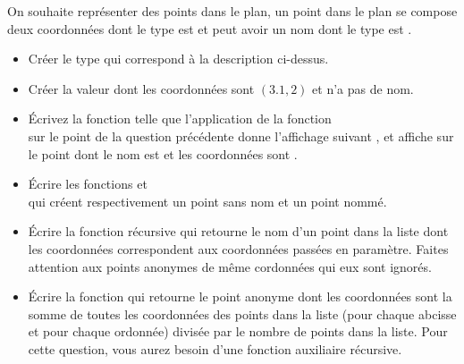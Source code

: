 \begin{qu}
On souhaite représenter des points dans le plan, un point dans le
  plan se compose deux coordonnées dont le type est  et peut
  avoir un nom dont le type est .
  \begin{itemize}
  \item Créer le type  qui correspond à la description
    ci-dessus.
   \item Créer la valeur  dont les coordonnées sont
     $(3.1, 2)$ et n'a pas de nom.
  \item Écrivez la fonction 
    telle que l'application de la fonction\\  sur le
    point de la question précédente donne l'affichage suivant , et affiche 
    sur le point dont le nom est  et les coordonnées sont
    .
  \item Écrire les fonctions
     et\\
    qui créent respectivement un point sans nom et un point nommé.
  \item Écrire la fonction récursive
    qui retourne le nom d'un point dans la liste dont les coordonnées
    correspondent aux coordonnées passées en paramètre. Faites attention
    aux points anonymes de même cordonnées qui eux sont ignorés.
    \item Écrire la fonction 
      qui retourne le point anonyme dont les coordonnées sont la somme de
      toutes les coordonnées des points dans la liste (pour chaque abcisse et pour chaque ordonnée) divisée par le
      nombre de points dans la liste. Pour cette question, vous aurez
      besoin d'une fonction auxiliaire récursive.      
  \end{itemize}
\end{qu}

